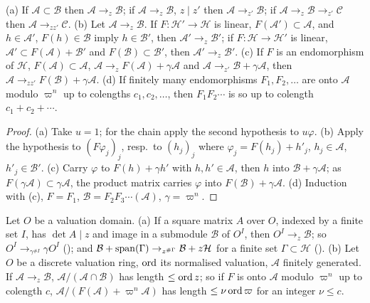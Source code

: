 \begin{lemma}
\label{data:lem:calculus}
(a) If $\mathcal{A} \subset \mathcal{B}$ then $\mathcal{A} \to_z \mathcal{B}$; if
$\mathcal{A} \to_z \mathcal{B}$, $z \mid z'$ then $\mathcal{A} \to_{z'} \mathcal{B}$; if
$\mathcal{A} \to_z \mathcal{B} \to_{z'} \mathcal{C}$ then $\mathcal{A} \to_{zz'} \mathcal{C}$.
(b) Let $\mathcal{A} \to_z \mathcal{B}$. If $F \colon \mathcal{H}' \to \mathcal{H}$ is linear,
$F(\mathcal{A}') \subset \mathcal{A}$, and $h \in \mathcal{A}'$, $F(h) \in \mathcal{B}$ imply
$h \in \mathcal{B}'$, then $\mathcal{A}' \to_z \mathcal{B}'$; if
$F \colon \mathcal{H} \to \mathcal{H}'$ is linear, $\mathcal{A}' \subset F(\mathcal{A}) +
\mathcal{B}'$ and $F(\mathcal{B}) \subset \mathcal{B}'$, then $\mathcal{A}' \to_z \mathcal{B}'$.
(c) If $F$ is an endomorphism of $\mathcal{H}$, $F(\mathcal{A}) \subset \mathcal{A}$,
$\mathcal{A} \to_z F(\mathcal{A}) + \gamma\mathcal{A}$ and
$\mathcal{A} \to_{z'} \mathcal{B} + \gamma\mathcal{A}$, then
$\mathcal{A} \to_{zz'} F(\mathcal{B}) + \gamma\mathcal{A}$. (d) If finitely many endomorphisms
$F_1, F_2, \dots$ are onto $\mathcal{A}$ modulo $\varpi^n$ up to colengths $c_1, c_2, \dots$, then
$F_1F_2\cdots$ is so up to colength $c_1 + c_2 + \cdots$.
\end{lemma}

\begin{proof}
(a) Take $u = 1$; for the chain apply the second hypothesis to $u\varphi$. (b) Apply the hypothesis
to $(F\varphi_j)_j$, resp.\ to $(h_j)_j$ where $\varphi_j = F(h_j) + h'_j$, $h_j \in \mathcal{A}$,
$h'_j \in \mathcal{B}'$. (c) Carry $\varphi$ to $F(h) + \gamma h'$ with $h, h' \in \mathcal{A}$,
then $h$ into $\mathcal{B} + \gamma\mathcal{A}$; as $F(\gamma\mathcal{A}) \subset
\gamma\mathcal{A}$, the product matrix carries $\varphi$ into $F(\mathcal{B}) + \gamma\mathcal{A}$.
(d) Induction with (c), $F = F_1$, $\mathcal{B} = F_2F_3\cdots(\mathcal{A})$, $\gamma = \varpi^n$.
\end{proof}

\begin{lemma}
\label{data:lem:valuation}
Let $O$ be a valuation domain. (a) If a square matrix $A$ over $O$, indexed by a finite set $I$,
has $\det A \mid z$ and image in a submodule $\mathcal{B}$ of $O^I$, then $O^I \to_z \mathcal{B}$;
so $O^I \to_{\gamma^{\#I}} \gamma O^I$ (); and
$\mathcal{B} + \operatorname{span}(\Gamma) \to_{z^{\#\Gamma}} \mathcal{B} + z\mathcal{H}$ for a finite set
$\Gamma \subset \mathcal{H}$ (). (b) Let $O$ be a discrete
valuation ring, $\operatorname{ord}$ its normalised valuation, $\mathcal{A}$ finitely generated. If
$\mathcal{A} \to_z \mathcal{B}$, $\mathcal{A}/(\mathcal{A}\cap\mathcal{B})$ has length
$\le \operatorname{ord} z$; so if $F$ is onto $\mathcal{A}$ modulo $\varpi^n$ up to colength $c$,
$\mathcal{A}/(F(\mathcal{A})+\varpi^n\mathcal{A})$ has length $\le \nu\operatorname{ord}\varpi$ for an integer
$\nu \le c$.
\end{lemma}

